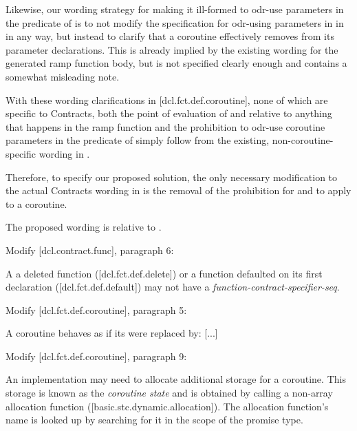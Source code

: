 Likewise, our wording strategy for making it ill-formed to odr-use parameters in the predicate of  is to not modify the specification for odr-using parameters in  in \cite{P2900R8} in any way, but instead to clarify that a coroutine effectively removes  from its parameter declarations. This is already implied by the existing wording for the generated ramp function body, but is not specified clearly enough and contains a somewhat misleading note.

With these wording clarifications in [dcl.fct.def.coroutine], none of which are specific to Contracts, both the point of evaluation of  and  relative to anything that happens in the ramp function and the prohibition to odr-use coroutine parameters in the predicate of  simply follow from the existing, non-coroutine-specific wording in \cite{P2900R8}.

Therefore, to specify our proposed solution, the only necessary modification to the actual Contracts wording in \cite{P2900R8} is the removal of the prohibition for  and  to apply to a coroutine.

The proposed wording is relative to \cite{P2900R8}.

Modify [dcl.contract.func], paragraph 6:
\begin{adjustwidth}{0.5cm}{0.5cm}
A a deleted function ([dcl.fct.def.delete])\removed{,} or a function defaulted on its first declaration ([dcl.fct.def.default]) may not have a \emph{function-contract-specifier-seq}.
\end{adjustwidth}

Modify [dcl.fct.def.coroutine], paragraph 5:

\begin{adjustwidth}{0.5cm}{0.5cm}
A coroutine behaves as if its  were replaced by: [...]
\end{adjustwidth}

Modify [dcl.fct.def.coroutine], paragraph 9:
\begin{adjustwidth}{0.5cm}{0.5cm}
An implementation may need to allocate additional storage for a coroutine. This storage is known as the \emph{coroutine state} and is obtained by calling a non-array allocation function ([basic.stc.dynamic.allocation]). The allocation function's name is looked up by searching for it in the scope of the promise type.
\end{adjustwidth}

